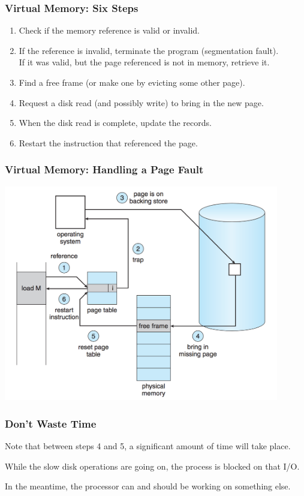 \begin{frame}
\frametitle{Virtual Memory: Six Steps}

\begin{enumerate}
	\item Check if the memory reference is valid or invalid.
	\item If the reference is invalid, terminate the program (segmentation fault).\\
	 If it was valid, but the page referenced is not in memory, retrieve it.
	\item Find a free frame (or make one by evicting some other page).
	\item Request a disk read (and possibly write) to bring in the new page.
	\item When the disk read is complete, update the records.
	\item Restart the instruction that referenced the page.
\end{enumerate}


\end{frame}

\begin{frame}
\frametitle{Virtual Memory: Handling a Page Fault}

\begin{center}
\includegraphics[width=0.9\textwidth]{images/handling-page-fault.png}
\end{center}


\end{frame}

\begin{frame}
\frametitle{Don't Waste Time}

Note that between steps 4 and 5, a significant amount of time will take place.

While the slow disk operations are going on, the process is blocked on that I/O.

In the meantime, the processor can and should be working on something else.

\end{frame}

